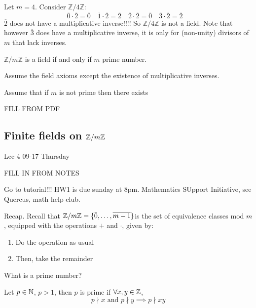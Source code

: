 \documentclass[12pt]{article}
\newcommand{\lecdate}[1]{ %
    \vspace{0in}
    \begin{flushright}
        #1
    \end{flushright}
    \vspace{0in}
}
\begin{document}
\begin{remark}
    Let ${}m = 4{}$. Consider ${}\mathbb{Z} / 4 \mathbb{Z}{}$: \[
        \overline{0} \cdot \overline{2} = \overline{0} \quad
        \overline{1} \cdot \overline{2} = \overline{2} \quad
        \overline{2} \cdot \overline{2} = \overline{0} \quad
        \overline{3} \cdot \overline{2} = \overline{2} \quad
    \]
    ${}\overline{2}{}$ does not have a multiplicative inverse!!!! So ${}\mathbb{Z} / 4 \mathbb{Z}{}$ is not a field. Note that however ${}\overline{3}{}$ does have a multiplicative inverse, it is only for (non-unity) divisors of $m$ that lack inverses.
\end{remark}

\begin{thm}
    ${}\mathbb{Z} / m \mathbb{Z}{}$ is a field if and only if ${}m{}$ prime number.
\end{thm}
\begin{pf}
    Assume the field axioms except the existence of multiplicative inverses.

    Assume that if ${}m{}$ is not prime then there exists

    FILL FROM PDF
\end{pf}

\subsection{Finite fields on $\mathbb{Z} / m \mathbb{Z}$}
\lecdate{Lec 4 09-17 Thursday}

FILL IN FROM NOTES

Go to tutorial!!! HW1 is due sunday at 8pm. Mathematics SUpport Initiative, see Quercus, math help club.

Recap. Recall that $\mathbb{Z} / m \mathbb{Z} = \{ \bar{0}, \dots, \overline{m-1} \}$is the set of equivalence classes mod $m$, equipped with the operations $+$ and $\cdot$, given by:
\begin{enumerate}
    \item Do the operation as usual
    \item Then, take the remainder
\end{enumerate}

\begin{remark}
    What is a prime number?
\end{remark}

\begin{defn}
    Let $p \in \mathbb{N}$, $p > 1$, then $p$ is prime if $\forall x,y \in \mathbb{Z}$,\[
        p \nmid x \text{ and } p \nmid y \implies p \nmid xy
    \]
\end{defn}
\end{document}
